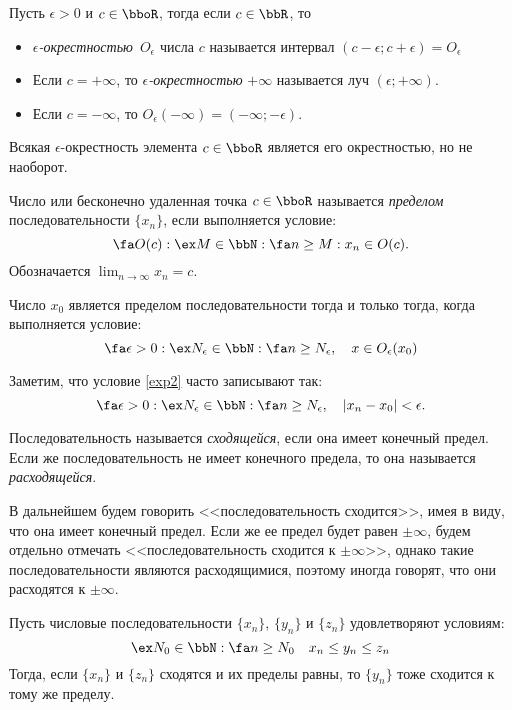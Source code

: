 \begin{defn}
Пусть $\epsilon > 0$ и $c \in \bboR $, тогда если $c \in \bbR$, то
\begin{itemize}
\item
\textit{$\epsilon$-окрестностью}~$O_\epsilon$ числа $c$ называется интервал $(c-\epsilon;c+\epsilon) = O_\epsilon$
\item
Если $c=+\infty$, то \textit{$\epsilon$-окрестностью} $+\infty$ называется луч $(\epsilon;+\infty)$.
\item
Если $c=-\infty$, то $O_\epsilon(-\infty)=(-\infty;-\epsilon)$.
\end{itemize}
\end{defn}
Всякая $\epsilon$-окрестность элемента $c \in \bboR$ является его окрестностью, но не наоборот.

\begin{defn}
Число или бесконечно удаленная точка $c \in \bboR$ называется \textit{пределом} последовательности $\{x_n\}$, если выполняется условие:
$$
\fa O(c): \ex M \in \bbN: \fa n \ge M: x_n \in O(c).
$$
Обозначается $\lim_{n \to \infty}\limits x_n = c$.
\end{defn}

\begin{lemm}
Число $x_0$ является пределом последовательности тогда и только тогда, когда выполняется условие:
\begin{equation}
\label{exp2}
\fa \epsilon>0: \ex N_\epsilon \in \bbN: \fa n \ge N_\epsilon,\quad x \in O_\epsilon(x_0)
\end{equation}
\end{lemm}
Заметим, что условие \eqref{exp2} часто записывают так:
$$
\fa \epsilon>0: \ex N_\epsilon \in \bbN: \fa n \ge N_\epsilon,\quad |x_n-x_0|<\epsilon.
$$
\begin{defn}
Последовательность называется \textit{сходящейся}, если она имеет конечный предел. Если же последовательность не имеет конечного предела, то она называется \textit{расходящейся}.
\end{defn}
В дальнейшем будем говорить <<последовательность сходится>>, имея в виду, что она имеет конечный предел. Если же ее предел будет равен $\pm\infty$, будем отдельно отмечать <<последовательность сходится к $\pm\infty$>>, однако такие последовательности являются расходящимися, поэтому иногда говорят, что они расходятся к $\pm\infty$. 
\begin{thm} \label{exp10}  
Пусть числовые последовательности $\{x_n\}$, $\{y_n\}$ и $\{z_n\}$ удовлетворяют условиям:
$$
\ex N_0 \in \bbN:\fa n\ge N_0 \quad x_n \le y_n \le z_n 
$$
Тогда, если $\{x_n\}$ и $\{z_n\}$ сходятся и их пределы равны, то $\{y_n\}$ тоже сходится к тому же пределу.
\end{thm}


